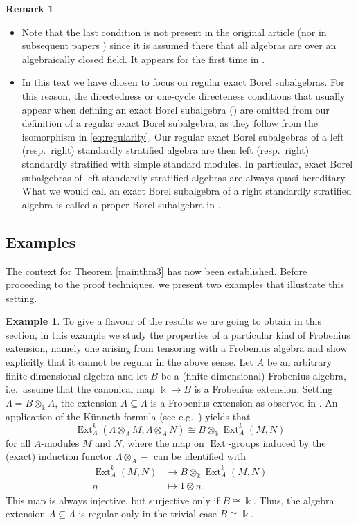 \documentclass[12pt,a4paper]{amsart}
\theoremstyle{plain}
\theoremstyle{definition}
\newtheorem{ex}[thm]{Example}
\newtheorem{rmk}[thm]{Remark}
\numberwithin{equation}{thm}
\DeclareMathOperator{\Ext}{Ext}
\begin{document}
\begin{rmk}
\begin{itemize}
\item Note that the last condition is not present in the original article \cite{Koe95} (nor in subsequent papers \cite{KKO14, BKK20, BPS23, Got24}) since it is assumed there that all algebras are over an algebraically closed field. It appears for the first time in \cite{Con21}. 
\item In this text we have chosen to focus on regular exact Borel subalgebras. For this reason, the directedness or one-cycle directeness conditions that usually appear when defining an exact Borel subalgebra (\cite{Koe95,BPS23,Got24}) are omitted from our definition of a regular exact Borel subalgebra, as they follow from the isomorphism in \eqref{eq:regularity}. Our regular exact Borel subalgebras of a left (resp.~right) standardly stratified algebra are then left (resp.~right) standardly stratified with simple standard modules. In particular, exact Borel subalgebras of left standardly stratified algebras are always quasi-hereditary. What we would call an exact Borel subalgebra of a right standardly stratified algebra is called a proper Borel subalgebra in \cite{Got24}. 
\end{itemize}
\end{rmk}

\subsection{Examples}
The context for Theorem \ref{mainthm3} has now been established. Before proceeding to the proof techniques, we present two examples that illustrate this setting.
\begin{ex}
To give a flavour of the results we are going to obtain in this section, in this example we study the properties of a particular kind of Frobenius extension, namely one arising from tensoring with a Frobenius algebra and show explicitly that it cannot be regular in the above sense. Let $A$ be an arbitrary finite-dimensional algebra and let $B$ be a (finite-dimensional) Frobenius algebra, i.e.\ assume that the canonical map $\Bbbk \rightarrow B$ is a Frobenius extension. Setting $\Lambda=B\otimes_\Bbbk A$, the extension $A\subseteq \Lambda$ is a Frobenius extension as observed in \cite[Beispiel 3 b)]{Kas54}. An application of the K\"unneth formula (see e.g.\ \cite[Lemma 4.10]{Pas19}) yields that 
\[\Ext_{\Lambda}^k(\Lambda\otimes_A M,\Lambda\otimes_A N)\cong B\otimes_\Bbbk \Ext^k_A(M,N)\]
for all $A$-modules $M$ and $N$, where the map on $\Ext$-groups induced by the (exact) induction functor $\Lambda\otimes_A -$ can be identified with 
\begin{align*}
\Ext^k_A(M,N)&\to B\otimes_\Bbbk \Ext^k_A(M,N)\\
\eta&\mapsto 1\otimes \eta.
\end{align*}
 This map is always injective, but surjective only if $B\cong \Bbbk$. Thus, the algebra extension $A\subseteq \Lambda$ is regular only in the trivial case $B\cong \Bbbk$. 
 \end{ex}
\end{document}
